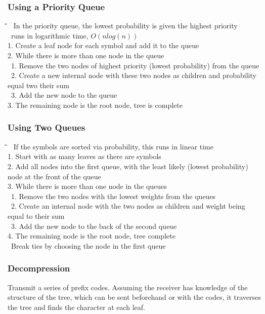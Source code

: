 \documentclass[10pt,letterpaper]{scrartcl}
\newcommand{\tbul}{\textbullet}
\newcommand{\tabDef}{\hspace{2em}\=\hspace{2em}\=\hspace{2em}\=\hspace{2em}\=\kill}
\begin{document}
\subsubsection{Using a Priority Queue}
\begin{tabbing}\tabDef
\tbul\ In the priority queue, the lowest probability is given the highest priority \\
\tbul\ runs in logarithmic time, $O(nlog(n))$ \\
1. Create a leaf node for each symbol and add it to the queue \\
2. While there is more than one node in the queue \\
    \>\ 1. Remove the two nodes of highest priority (lowest probability) from the queue \\
    \>\ 2. Create a new internal node with these two nodes as children and probability equal two their sum \\
    \>\ 3. Add the new node to the queue \\
3. The remaining node is the root node, tree is complete
\end{tabbing}	
\subsubsection{Using Two Queues}
\begin{tabbing}\tabDef
\tbul\ If the symbols are sorted via probability, this runs in linear time \\
1. Start with as many leaves as there are symbols \\
2. Add all nodes into the first queue, with the least likely (lowest probability) node at the front of the queue \\
3. While there is more than one node in the queues \\
    \>\ 1. Remove the two nodes with the lowest weights from the queues \\
    \>\ 2. Create an internal node with the two nodes as children and weight being equal to their sum \\
     \>\ 3. Add the new node to the back of the second queue \\
4. The remaining node is the root node, tree complete \\
\tbul\ Break ties by choosing the node in the first queue \\
\end{tabbing}
\subsubsection{Decompression}
Transmit a series of prefix codes. Assuming the receiver has knowledge of the structure of the tree, which can be sent beforehand or with the codes, it traverses the tree and finds the character at each leaf. 
\end{document}
